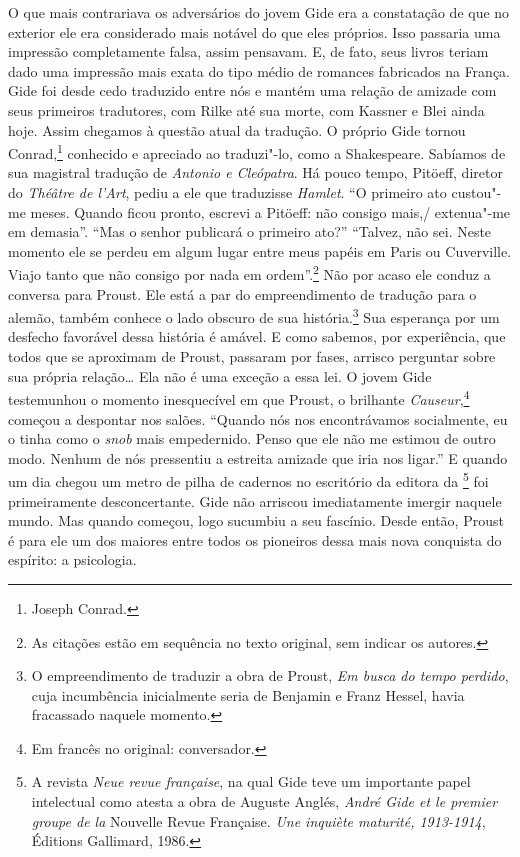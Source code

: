 O que mais contrariava os adversários do jovem Gide era a constatação de
que no exterior ele era considerado mais notável do que eles próprios.
Isso passaria uma impressão completamente falsa, assim pensavam.
E, de fato, seus livros teriam dado uma impressão mais exata do tipo médio de romances fabricados na França. Gide foi
desde cedo traduzido entre nós e mantém uma relação de amizade com seus
primeiros tradutores, com Rilke até sua morte, com Kassner e Blei ainda
hoje. Assim chegamos à questão atual da tradução. O próprio Gide
tornou Conrad,\footnote{Joseph
  Conrad. \versal{[N. E.]}} conhecido e apreciado ao traduzi"-lo, como a Shakespeare. Sabíamos de sua magistral tradução de
\emph{Antonio e Cleópatra}. Há pouco tempo, Pitöeff, diretor do
\emph{Théâtre de l'Art}, pediu a ele que traduzisse \emph{Hamlet}.
``O primeiro ato custou"-me meses. Quando ficou pronto, escrevi a
Pitöeff: não consigo mais,/ extenua"-me em demasia''. ``Mas o senhor
publicará o primeiro ato?'' ``Talvez, não sei. Neste momento ele se
perdeu em algum lugar entre meus papéis em Paris ou Cuverville. Viajo
tanto que não consigo por nada em ordem''.\footnote{As citações
  estão em sequência no texto original, sem indicar os autores. \versal{[N. T.]}} Não por acaso ele conduz a conversa para Proust. Ele está a
par do empreendimento de tradução para o alemão, também conhece o lado
obscuro de sua história.\footnote{O empreendimento de traduzir a
  obra de Proust, \emph{Em busca do tempo perdido}, cuja incumbência
  inicialmente seria de Benjamin e Franz Hessel, havia fracassado
  naquele momento. \versal{[N. T.]}} Sua esperança por um desfecho
favorável dessa história é amável. E como sabemos, por experiência, que todos
que se aproximam de Proust, passaram por fases, arrisco
perguntar sobre sua própria relação\ldots{} Ela não é uma exceção a essa lei.
O jovem Gide testemunhou o momento inesquecível em que Proust, o
brilhante \emph{Causeur},\footnote{Em francês no original: conversador. \versal{[N. T.]}} começou
a despontar nos salões. ``Quando nós nos encontrávamos socialmente, eu o
tinha como o \emph{snob} mais empedernido. Penso que ele não me
estimou de outro modo. Nenhum de nós pressentiu a estreita amizade que
iria nos ligar.'' E quando um dia chegou um metro de pilha de cadernos
no escritório da editora da \footnote{A revista
  \emph{Neue revue française}, na qual Gide teve um importante papel
  intelectual como atesta a obra de Auguste Anglés, \emph{André Gide et
  le premier groupe de la} Nouvelle Revue Française. \emph{Une inquiète
  maturité, 1913-1914}, Éditions Gallimard, 1986. \versal{[N. T.]}} foi
primeiramente desconcertante. Gide não arriscou imediatamente imergir
naquele mundo. Mas quando começou, logo sucumbiu a seu fascínio. Desde
então, Proust é para ele um dos maiores entre todos os pioneiros dessa
mais nova conquista do espírito: a psicologia.

